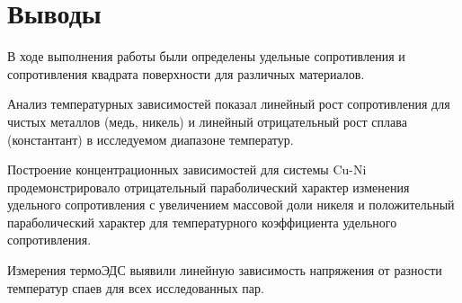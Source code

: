 \section*{Выводы}

В ходе выполнения работы были определены удельные сопротивления и сопротивления квадрата поверхности для различных материалов.

Анализ температурных зависимостей показал линейный рост сопротивления для чистых металлов (медь, никель) и линейный отрицательный рост сплава (константант) в исследуемом диапазоне температур.

Построение концентрационных зависимостей для системы Cu-Ni продемонстрировало отрицательный параболический характер изменения удельного сопротивления с увеличением массовой доли никеля и положительный параболический характер для температурного коэффициента удельного сопротивления. 

Измерения термоЭДС выявили линейную зависимость напряжения от разности температур спаев для всех исследованных пар.